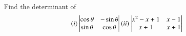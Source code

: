 \begin{flushleft}
Find the determinant of \\
\begin{align*}
(i) \begin{vmatrix}
\cos\theta& -\sin\theta\\ \sin\theta& \cos\theta 
\end{vmatrix} 
(ii)  \begin{vmatrix}
x^2-x+1& x-1\\ x+1&  x+1
\end{vmatrix} 
\end{align*}
\end{flushleft}
